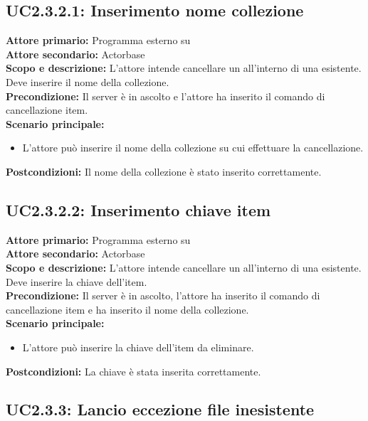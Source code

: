 \documentclass{scalatekids-article}
\begin{document}
\subsection{UC2.3.2.1: Inserimento nome collezione}

\textbf{Attore primario:} Programma esterno su \\
\textbf{Attore secondario:} Actorbase\\
\textbf{Scopo e descrizione:} L'attore intende cancellare un  all'interno di una  esistente. Deve inserire il nome della collezione.\\
\textbf{Precondizione:} Il server è in ascolto e l'attore ha inserito il comando di cancellazione item.\\
\textbf{Scenario principale:}
\begin{itemize}
\item L'attore può inserire il nome della collezione su cui effettuare la cancellazione.
\end{itemize}
\textbf{Postcondizioni:} Il nome della collezione è stato inserito correttamente.

\subsection{UC2.3.2.2: Inserimento chiave item}

\textbf{Attore primario:} Programma esterno su \\
\textbf{Attore secondario:} Actorbase\\
\textbf{Scopo e descrizione:} L'attore intende cancellare un  all'interno di una  esistente. Deve inserire la chiave dell'item.\\
\textbf{Precondizione:} Il server è in ascolto, l'attore ha inserito il comando di cancellazione item e ha inserito il nome della collezione.\\
\textbf{Scenario principale:}
\begin{itemize}
\item L'attore può inserire la chiave dell'item da eliminare.
\end{itemize}
\textbf{Postcondizioni:} La chiave è stata inserita correttamente.

\subsection{UC2.3.3: Lancio eccezione file inesistente}
\end{document}
